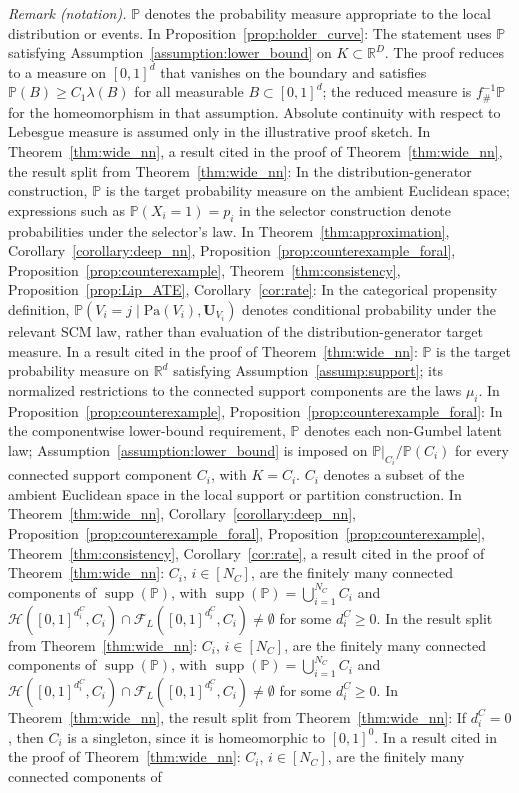 \documentclass[12pt]{article}
\theoremstyle{plain}
\theoremstyle{definition}
\theoremstyle{remark}
\begin{document}
\noindent\textit{Remark (notation).} $\mathbb{P}$ denotes the probability measure appropriate to the local distribution or events. In Proposition~\ref{prop:holder_curve}: The statement uses $\mathbb{P}$ satisfying Assumption~\ref{assumption:lower_bound} on $K\subset\mathbb{R}^D$. The proof reduces to a measure on $[0,1]^d$ that vanishes on the boundary and satisfies $\mathbb{P}(B)\geqslant C_1\lambda(B)$ for all measurable $B\subset[0,1]^d$; the reduced measure is $f^{-1}_{\#}\mathbb{P}$ for the homeomorphism in that assumption. Absolute continuity with respect to Lebesgue measure is assumed only in the illustrative proof sketch. In Theorem~\ref{thm:wide_nn}, a result cited in the proof of Theorem~\ref{thm:wide_nn}, the result split from Theorem~\ref{thm:wide_nn}: In the distribution-generator construction, $\mathbb P$ is the target probability measure on the ambient Euclidean space; expressions such as $\mathbb P(X_i=1)=p_i$ in the selector construction denote probabilities under the selector's law. In Theorem~\ref{thm:approximation}, Corollary~\ref{corollary:deep_nn}, Proposition~\ref{prop:counterexample_foral}, Proposition~\ref{prop:counterexample}, Theorem~\ref{thm:consistency}, Proposition~\ref{prop:Lip_ATE}, Corollary~\ref{cor:rate}: In the categorical propensity definition, $\mathbb{P}(V_i=j\mid\text{Pa}(V_i),\boldsymbol{U}_{V_i})$ denotes conditional probability under the relevant SCM law, rather than evaluation of the distribution-generator target measure. In a result cited in the proof of Theorem~\ref{thm:wide_nn}: $\mathbb P$ is the target probability measure on $\mathbb R^d$ satisfying Assumption~\ref{assump:support}; its normalized restrictions to the connected support components are the laws $\mu_i$. In Proposition~\ref{prop:counterexample}, Proposition~\ref{prop:counterexample_foral}: In the componentwise lower-bound requirement, $\mathbb P$ denotes each non-Gumbel latent law; Assumption~\ref{assumption:lower_bound} is imposed on $\mathbb P|_{C_i}/\mathbb P(C_i)$ for every connected support component $C_i$, with $K=C_i$. $C_i$ denotes a subset of the ambient Euclidean space in the local support or partition construction. In Theorem~\ref{thm:wide_nn}, Corollary~\ref{corollary:deep_nn}, Proposition~\ref{prop:counterexample_foral}, Proposition~\ref{prop:counterexample}, Theorem~\ref{thm:consistency}, Corollary~\ref{cor:rate}, a result cited in the proof of Theorem~\ref{thm:wide_nn}: $C_i$, $i\in[N_C]$, are the finitely many connected components of $\operatorname{supp}(\mathbb{P})$, with $\operatorname{supp}(\mathbb{P})=\bigcup_{i=1}^{N_C}C_i$ and $\mathcal{H}([0,1]^{d_i^C},C_i)\cap\mathcal{F}_L([0,1]^{d_i^C},C_i)\neq\emptyset$ for some $d_i^C\geqslant0$. In the result split from Theorem~\ref{thm:wide_nn}: $C_i$, $i\in[N_C]$, are the finitely many connected components of $\operatorname{supp}(\mathbb P)$, with $\operatorname{supp}(\mathbb P)=\bigcup_{i=1}^{N_C}C_i$ and $\mathcal H([0,1]^{d_i^C},C_i)\cap\mathcal F_L([0,1]^{d_i^C},C_i)\neq\emptyset$ for some $d_i^C\geqslant0$. In Theorem~\ref{thm:wide_nn}, the result split from Theorem~\ref{thm:wide_nn}: If $d_i^C=0$, then $C_i$ is a singleton, since it is homeomorphic to $[0,1]^0$. In a result cited in the proof of Theorem~\ref{thm:wide_nn}: $C_i$, $i\in[N_C]$, are the finitely many connected components of 
\end{document}
